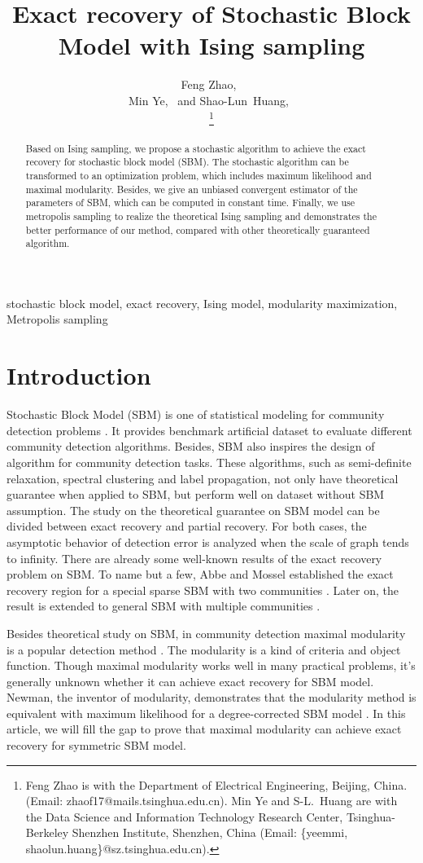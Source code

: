 \documentclass[journal]{IEEEtran}
\title{Exact recovery of Stochastic Block Model with Ising sampling}
\author{
	Feng Zhao,~\IEEEmembership{Student Member, IEEE}\\
	Min Ye,~\IEEEmembership{Member, IEEE} and
	Shao-Lun~Huang,~\IEEEmembership{Member, IEEE}\\
	\thanks{Feng Zhao is with the
		Department of Electrical Engineering, Beijing, China.
		(Email: zhaof17@mails.tsinghua.edu.cn).
		Min Ye and S-L.~Huang are with the Data Science and Information
		Technology Research Center, Tsinghua-Berkeley Shenzhen Institute,
		Shenzhen, China (Email: \{yeemmi, shaolun.huang\}@sz.tsinghua.edu.cn).
	}}
\begin{document}
	\maketitle
\begin{abstract}
	Based on Ising sampling, we propose a stochastic algorithm to achieve the exact recovery for stochastic block model (SBM).
	The stochastic algorithm can be transformed to an optimization problem, which includes maximum likelihood and maximal modularity.
	Besides, we give an unbiased convergent estimator of the parameters of SBM, which can be computed in constant time.
	Finally, we use metropolis sampling to realize the theoretical Ising sampling and demonstrates the better performance of our method,
	compared with other theoretically guaranteed algorithm.
\end{abstract}
\begin{IEEEkeywords}
	stochastic block model, exact recovery, Ising model, modularity maximization, Metropolis sampling
\end{IEEEkeywords}
\section{Introduction}
Stochastic Block Model (SBM) is one of statistical modeling for community detection problems  \cite{holland1983stochastic, abbe2017community}.
It provides benchmark artificial dataset to evaluate different community detection algorithms.
Besides, SBM also inspires the design of algorithm for community detection tasks. These algorithms, such as
semi-definite relaxation, spectral clustering and label propagation, not only have theoretical guarantee when applied to SBM,
but perform well on dataset without SBM assumption. The study on the theoretical guarantee on SBM model can be divided between
exact recovery and partial recovery. For both cases, the asymptotic behavior of detection error
is analyzed when the scale of graph tends to infinity. There are already some well-known results of the exact recovery problem
on SBM.	To name but a few, Abbe and Mossel established the exact recovery region for a special sparse SBM with two communities  \cite{abbe2015exact, mossel2016}.
Later on, the result is extended to general SBM with multiple communities \cite{abbe2015community}.

Besides theoretical study on SBM, in community detection maximal modularity is a popular detection method \cite{Newman8577}.
The modularity is a kind of criteria and object function. Though maximal modularity works well in many practical problems, it's
generally unknown whether it can achieve exact recovery for SBM model. Newman, the inventor of modularity, demonstrates that
the modularity method is equivalent with maximum likelihood for a degree-corrected SBM model \cite{newman2016equivalence}. In this article,
we will fill the gap to prove that maximal modularity can achieve exact recovery for symmetric SBM model.
\end{document}
